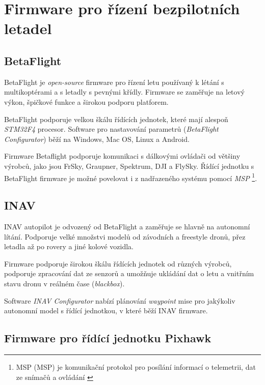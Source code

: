 \chapter{Firmware pro řízení bezpilotních letadel}

\section{BetaFlight}

BetaFlight je \textit{open-source} firmware pro řízení letu používaný k létání s multikoptérami a s letadly s pevnými křídly. Firmware se zaměřuje na letový výkon, špičkové funkce a širokou podporu platforem.

BetaFlight podporuje velkou škálu řídících jednotek, které mají alespoň \textit{STM32F4} procesor. Software pro nastavování parametrů (\textit{BetaFlight Configurator}) běží na Windows, Mac OS, Linux a Android.

Firmware Betaflight podporuje komunikaci s dálkovými ovládači od většiny výrobců, jako jsou FrSky, Graupner, Spektrum, DJI a FlySky. Řídící jednotku s BetaFlight firmware je možné povelovat i z nadřazeného systému pomocí \textit{\acs{MSP}} \footnote{\acs{MSP} (\acl{MSP}) je komunikační protokol pro posílání informací o telemetrii, dat ze snímačů a ovládání \cite{ARDU}}. \cite{BetaF}

\section{INAV}

INAV autopilot je odvozený od BetaFlight a zaměřuje se hlavně na autonomní lítání. Podporuje velké množstvi modelů od závodních a freestyle dronů, přez letadla až po rovery a jiné kolové vozidla.

Firmware podporuje širokou škálu řídících jednotek od různých výrobců, podporuje zpracování dat ze senzorů a umožňuje ukládání dat o letu a vnitřním stavu dronu v reálném čase (\textit{blackbox}). \cite{INAV}

Software\textbf{} \textit{INAV Configurator} nabízí plánování \textit{waypoint} mise pro jakýkoliv autonomní model s řídící jednotkou, v které běží INAV firmware.

\section{Firmware pro řídící jednotku Pixhawk}

